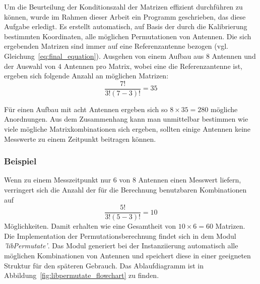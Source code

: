 %

%
Um die Beurteilung der Konditionszahl der Matrizen effizient durchführen zu können, wurde im Rahmen dieser Arbeit ein Programm geschrieben, das diese Aufgabe erledigt. Es erstellt automatisch, auf Basis der durch die Kalibrierung bestimmten Koordinaten, alle möglichen Permutationen von Antennen. Die sich ergebenden Matrizen sind immer auf eine Referenzantenne bezogen (vgl. Gleichung~\ref{eq:final_equation}). Ausgehen von einem Aufbau aus $8$ Antennen und der Auswahl von $4$ Antennen pro Matrix, wobei eine die Referenzantenne ist, ergeben sich folgende Anzahl an möglichen Matrizen:
% 
\begin{equation}
	\frac{7!}{3!(7-3)!}=35
% 
\end{equation}

%
Für einen Aufbau mit acht Antennen ergeben sich so $8\times 35 = 280$ mögliche Anordnungen. Aus dem Zusammenhang kann man unmittelbar bestimmen wie viele mögliche Matrixkombinationen sich ergeben, sollten einige Antennen keine Messwerte zu einem Zeitpunkt beitragen können.
%
\subsubsection{Beispiel}
%
Wenn zu einem Messzeitpunkt nur $6$ von $8$ Antennen einen Messwert liefern, verringert sich die Anzahl der für die Berechnung benutzbaren Kombinationen auf
%
\begin{equation}
	\frac{5!}{3!(5-3)!}=10 \nonumber
% 
\end{equation}
Möglichkeiten. Damit erhalten wie eine Gesamtheit von $10\times6=60$ Matrizen. \\
%

Die Implementation  der Permutationsberechnung findet sich in dem Modul \textit{'libPermutate'}. Das Modul generiert bei der Instanziierung automatisch alle möglichen Kombinationen von Antennen und speichert diese in einer geeigneten Struktur für den späteren Gebrauch. Das Ablaufdiagramm ist in Abbildung~\ref{fig:libpermutate_flowchart} zu finden.\\



